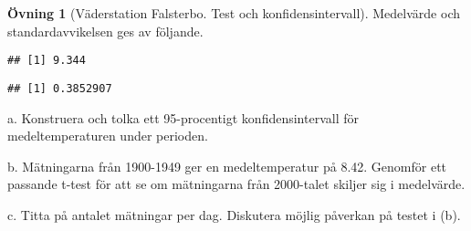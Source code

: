 \documentclass[
]{book}
\newenvironment{Shaded}{\begin{snugshade}}{\end{snugshade}}
\newcommand{\FunctionTok}[1]{\textcolor[rgb]{0.00,0.00,0.00}{#1}}
\newcommand{\NormalTok}[1]{#1}
\newcommand{\SpecialCharTok}[1]{\textcolor[rgb]{0.00,0.00,0.00}{#1}}
\theoremstyle{definition}
\theoremstyle{definition}
\theoremstyle{definition}
\newtheorem{exercise}{Övning}[chapter]
\theoremstyle{definition}
\theoremstyle{remark}
\begin{document}
\begin{exercise}[Väderstation Falsterbo. Test och konfidensintervall]
Medelvärde och standardavvikelsen ges av följande.

\begin{Shaded}
\end{Shaded}

\begin{verbatim}
## [1] 9.344
\end{verbatim}

\begin{Shaded}
\end{Shaded}

\begin{verbatim}
## [1] 0.3852907
\end{verbatim}

a. Konstruera och tolka ett 95-procentigt konfidensintervall för medeltemperaturen under perioden.

b. Mätningarna från 1900-1949 ger en medeltemperatur på 8.42. Genomför ett passande t-test för att se om mätningarna från 2000-talet skiljer sig i medelvärde.

c. Titta på antalet mätningar per dag. Diskutera möjlig påverkan på testet i (b).
\end{exercise}
\end{document}
